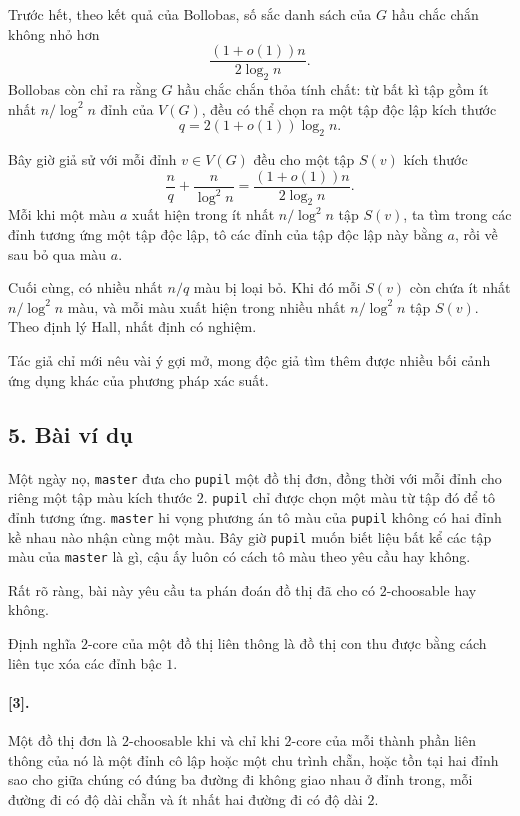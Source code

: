 \documentclass[11pt]{article}
\begin{document}
Trước hết, theo kết quả của Bollobas, số sắc danh sách của \(G\) hầu chắc chắn
không nhỏ hơn
\[
  \frac{(1+o(1))n}{2\log_2 n}.
\]
Bollobas còn chỉ ra rằng \(G\) hầu chắc chắn thỏa tính chất: từ bất kì tập gồm
ít nhất \(n/\log^2 n\) đỉnh của \(V(G)\), đều có thể chọn ra một tập độc lập
kích thước
\[
  q=2(1+o(1))\log_2 n.
\]

Bây giờ giả sử với mỗi đỉnh \(v\in V(G)\) đều cho một tập \(S(v)\) kích thước
\[
  \frac nq+\frac{n}{\log^2 n}
  =\frac{(1+o(1))n}{2\log_2 n}.
\]
Mỗi khi một màu \(a\) xuất hiện trong ít nhất \(n/\log^2 n\) tập \(S(v)\), ta
tìm trong các đỉnh tương ứng một tập độc lập, tô các đỉnh của tập độc lập này
bằng \(a\), rồi về sau bỏ qua màu \(a\).

Cuối cùng, có nhiều nhất \(n/q\) màu bị loại bỏ. Khi đó mỗi \(S(v)\) còn chứa
ít nhất \(n/\log^2 n\) màu, và mỗi màu xuất hiện trong nhiều nhất
\(n/\log^2 n\) tập \(S(v)\). Theo định lý Hall, nhất định có nghiệm.

Tác giả chỉ mới nêu vài ý gợi mở, mong độc giả tìm thêm được nhiều bối cảnh
ứng dụng khác của phương pháp xác suất.

\subsection*{5. Bài ví dụ}

\paragraph{}
Một ngày nọ, \texttt{master} đưa cho \texttt{pupil} một đồ thị đơn, đồng thời
với mỗi đỉnh cho riêng một tập màu kích thước \(2\). \texttt{pupil} chỉ được
chọn một màu từ tập đó để tô đỉnh tương ứng. \texttt{master} hi vọng phương án
tô màu của \texttt{pupil} không có hai đỉnh kề nhau nào nhận cùng một màu. Bây
giờ \texttt{pupil} muốn biết liệu bất kể các tập màu của \texttt{master} là
gì, cậu ấy luôn có cách tô màu theo yêu cầu hay không.

Rất rõ ràng, bài này yêu cầu ta phán đoán đồ thị đã cho có \(2\)-choosable hay
không.

Định nghĩa \(2\)-core của một đồ thị liên thông là đồ thị con thu được bằng
cách liên tục xóa các đỉnh bậc \(1\).

\paragraph{ [3].}
Một đồ thị đơn là \(2\)-choosable khi và chỉ khi \(2\)-core của mỗi thành phần
liên thông của nó là một đỉnh cô lập hoặc một chu trình chẵn, hoặc tồn tại hai
đỉnh sao cho giữa chúng có đúng ba đường đi không giao nhau ở đỉnh trong, mỗi
đường đi có độ dài chẵn và ít nhất hai đường đi có độ dài \(2\).
\end{document}
